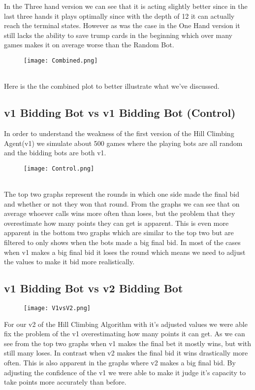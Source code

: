 In the Three hand version we can see that it is acting slightly better since in the last three hands it plays optimally since with the depth of 12 it can actually reach the terminal states.
However as was the case in the One Hand version it still lacks the ability to save trump cards in the beginning which over many games makes it on average worse than the Random Bot.
\begin{figure}[h]
    \centering
    \texttt{[image: Combined.png]}
\end{figure}\\
Here is the the combined plot to better illustrate what we've discussed.
\pagebreak
\subsection{v1 Bidding Bot vs v1 Bidding Bot (Control)}
In order to understand the weakness of the first version of the Hill Climbing Agent(v1) we simulate about 500 games where the playing bots are all random and the bidding bots are both v1.
\begin{figure}[h]
    \centering
    \texttt{[image: Control.png]}
\end{figure}\\
The top two graphs represent the rounds in which one side made the final bid and whether or not they won that round. 
From the graphs we can see that on average whoever calls wins more often than loses, but the problem that they overestimate how many points they can get is apparent. 
This is even more apparent in the bottom two graphs which are similar to the top two but are filtered to only shows when the bots made a big final bid.
In most of the cases when v1 makes a big final bid it loses the round which means we need to adjust the values to make it bid more realistically.
\pagebreak
\subsection{v1 Bidding Bot vs v2 Bidding Bot}
\begin{figure}[h]
    \centering
    \texttt{[image: V1vsV2.png]}
\end{figure}
For our v2 of the Hill Climbing Algorithm with it's adjusted values we were able fix the problem of the v1 overestimating how many points it can get.
As we can see from the top two graphs when v1 makes the final bet it mostly wins, but with still many loses. 
In contrast when v2 makes the final bid it wins drastically more often. 
This is also apparent in the graphs where v2 makes a big final bid. By adjusting the confidence of the v1 we were
able to make it judge it's capacity to take points more accurately than before. 
